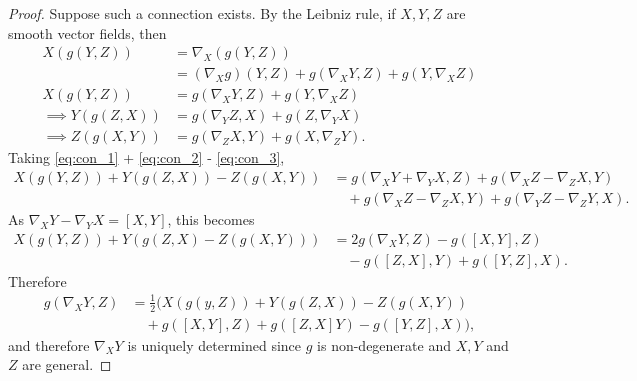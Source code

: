 \begin{proof}
    Suppose such a connection exists. By the Leibniz rule, if $X,Y,Z$ are smooth vector fields, then
    \begin{align}
        X \left( g \left( Y,Z \right)  \right) &= \nabla_X \left( g \left( Y , Z \right)  \right)\\
                                               &= \left( \nabla_X g \right) \left( Y,Z \right)  + g \left( \nabla_X Y, Z \right) + g \left( Y, \nabla_X Z \right) \\
        X \left( g \left( Y,Z \right)  \right) &=  g \left( \nabla_X Y, Z \right) + g \left( Y, \nabla_X Z \right) \label{eq:con_1}\\
        \implies Y \left( g \left( Z,X \right)  \right) &=  g \left( \nabla_Y Z, X \right) + g \left( Z, \nabla_Y X \right)  \label{eq:con_2}\\
        \implies Z \left( g \left( X,Y \right)  \right) &=  g \left( \nabla_Z X, Y \right) + g \left( X, \nabla_Z Y \right) \label{eq:con_3}
    .\end{align}
    Taking \cref{eq:con_1}  + \cref{eq:con_2} - \cref{eq:con_3},
    \begin{align}
        X \left( g \left( Y,Z \right)  \right) + Y \left( g \left( Z,X \right)  \right) - Z \left( g \left( X,Y \right)  \right) &= g \left( \nabla_X Y + \nabla_Y X, Z \right) + g \left( \nabla_X Z - \nabla_Z X, Y \right)  \\
        &\quad + g \left( \nabla_X Z - \nabla_Z X, Y \right) + g \left( \nabla_Y Z - \nabla_Z Y, X \right) 
    .\end{align}
    As $\nabla_X Y - \nabla_Y X = \left[ X, Y \right] $, this becomes
    \begin{align}
        X \left( g \left( Y,Z \right)  \right) + Y \left( g \left( Z,X \right) - Z \left( g \left( X,Y \right)  \right)  \right)  &= 2 g \left( \nabla_X Y,Z \right) - g \left( \left[ X, Y \right] ,Z \right)  \\
        &\quad -g \left( \left[ Z,X  \right],Y  \right) + g \left( \left[ Y, Z \right] ,X \right) 
    .\end{align}
    Therefore
    \begin{align}
        g \left( \nabla_X Y,Z \right) &= \frac{1}{2} \bigg( X \left( g \left( y,Z \right)  \right) + Y \left( g \left( Z,X \right)  \right) - Z \left( g \left( X,Y \right)  \right) \\
        &\quad  + g\left( \left[ X, Y \right] ,Z \right) + g\left( \left[ Z, X \right] Y \right) - g \left( \left[ Y, Z \right] ,X \right)  \bigg) 
    ,\end{align}
    and therefore $\nabla_X Y$ is uniquely determined since $g$ is non-degenerate and $X,Y$ and $Z$ are general.
\end{proof}

